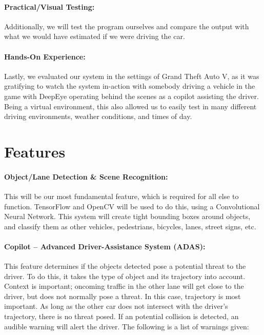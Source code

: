 \pagebreak

\paragraph{Practical/Visual Testing:} Additionally, we will test the program ourselves and compare the output with what we would have estimated if we were driving the car.

\paragraph{Hands-On Experience:} Lastly, we evaluated our system in the settings of Grand Theft Auto V, as it was gratifying to watch the system in-action with somebody driving a vehicle in the game with DeepEye operating behind the scenes as a copilot assisting the driver. Being a virtual environment, this also allowed us to easily test in many different driving environments, weather conditions, and times of day. 



\section{Features}
\paragraph{Object/Lane Detection \& Scene Recognition:} This will be our most fundamental feature, which is required for all else to function.  TensorFlow and OpenCV will be used to do this, using a Convolutional Neural Network.  This system will create tight bounding boxes around objects, and classify them as other vehicles, pedestrians, bicycles, lanes, street signs, etc.
\par

\paragraph{Copilot -- Advanced Driver-Assistance System (ADAS):} This feature determines if the objects detected pose a potential threat to the driver. To do this, it takes the type of object and its trajectory into account.  Context is important; oncoming traffic in the other lane will get close to the driver, but does not normally pose a threat. In this case, trajectory is most important. As long as the other car does not intersect with the driver's trajectory, there is no threat posed.  If an potential collision is detected, an audible warning will alert the driver. The following is a list of warnings given:

